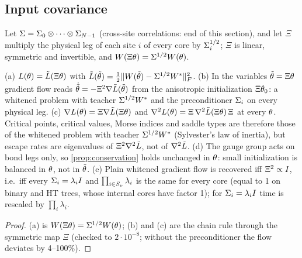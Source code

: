 \subsection{Input covariance}\label{app:covariance}

Let $\Sigma=\Sigma_{0}\otimes\dots\otimes\Sigma_{N-1}$ (cross-site correlations: end of this section), and let $\Xi$ multiply the
physical leg of each site $i$ of every core by $\Sigma_{i}^{1/2}$; $\Xi$ is linear, symmetric and invertible, and
$W(\Xi\theta)=\Sigma^{1/2}W(\theta)$.

\begin{proposition}\label{prop:A-precond}
  \proven{} 
  (a) $L(\theta)=\tilde{L}(\Xi\theta)$ with $\tilde{L}(\tilde{\theta})=\frac12\lVert W(\tilde{\theta})-\Sigma^{1/2}W^{*}\rVert_{F}^2$.
  (b) In the variables $\tilde{\theta}=\Xi\theta$ gradient flow reads $\dot{\tilde{\theta}}=-\Xi^2\nabla\tilde{L}(\tilde{\theta})$ from
  the anisotropic initialization $\Xi\theta_0$: a whitened problem with teacher $\Sigma^{1/2}W^{*}$ and the
  preconditioner $\Sigma_{i}$ on every physical leg.
  (c) $\nabla L(\theta)=\Xi\nabla\tilde{L}(\Xi\theta)$ and $\nabla^2L(\theta)=\Xi\,\nabla^2\tilde{L}(\Xi\theta)\,\Xi$ at every
  $\theta$. Critical points, critical values, Morse indices and saddle types are therefore those of the
  whitened problem with teacher $\Sigma^{1/2}W^{*}$ (Sylvester's law of inertia), but escape rates are
  eigenvalues of $\Xi^2\nabla^2\tilde{L}$, not of $\nabla^2\tilde{L}$.
  (d) The gauge group acts on bond legs only, so \cref{prop:conservation} holds unchanged in $\theta$: small
  initialization is balanced in $\theta$, not in $\tilde{\theta}$.
  (e) Plain whitened gradient flow is recovered iff $\Xi^2\propto I$, i.e.\ iff every $\Sigma_{i}=\lambda_iI$ and
  $\prod_{i\in S_{v}}\lambda_i$ is the same for every core (equal to 1 on binary and HT trees, whose internal
  cores have factor 1); for $\Sigma_{i}=\lambda_iI$ time is rescaled by $\prod_i\lambda_i$.
\end{proposition}
\begin{proof}
  (a) is $W(\Xi\theta)=\Sigma^{1/2}W(\theta)$; (b) and (c) are the chain rule through the symmetric map $\Xi$
  (checked to $2\cdot10^{-8}$; without the preconditioner the flow deviates by 4--100\%).
\end{proof}

